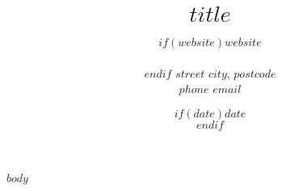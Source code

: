 \documentclass[11pt, a4paper]{article}
\title{$title$} %
\date{$if(date)$$date$\\$endif$} %
\author{$if(website)$$website$\\\\$endif$
$street$ \textbar{} $city$, $postcode$\\ %
$phone$ \textbar{} $email$ } %
\begin{document}
\maketitle
\begin{raggedright}
$body$
\end{raggedright}
\end{document}
